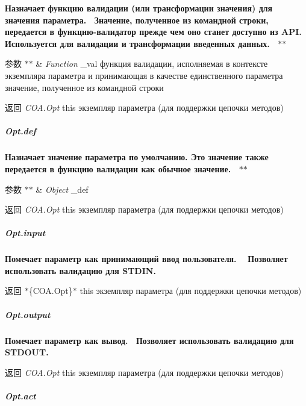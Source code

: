 {\bfseries {\bfseries {\bfseries {\bfseries  Назначает функцию валидации (или трансформации значения) для значения параметра.~\newline
 Значение, полученное из командной строки, передается в функцию-\/валидатор прежде чем оно станет доступно из A\+PI.~\newline
 Используется для валидации и трансформации введенных данных.~\newline
 $\ast$$\ast$
\begin{DoxyParams}{参数}
{\em $\ast$$\ast$} & {\itshape Function} {\ttfamily \+\_\+val} функция валидации, исполняемая в контексте экземпляра параметра и принимающая в качестве единственного параметра значение, полученное из командной строки~\newline
 {\bfseries }\\
\hline
\end{DoxyParams}
\begin{DoxyReturn}{返回}
{\bfseries } {\itshape C\+O\+A.\+Opt} {\ttfamily this} экземпляр параметра (для поддержки цепочки методов)
\end{DoxyReturn}
\subparagraph*{Opt.\+def}}}}}

{\bfseries {\bfseries {\bfseries {\bfseries  Назначает значение параметра по умолчанию. Это значение также передается в функцию валидации как обычное значение.~\newline
 $\ast$$\ast$
\begin{DoxyParams}{参数}
{\em $\ast$$\ast$} & {\itshape Object} {\ttfamily \+\_\+def}~\newline
 {\bfseries }\\
\hline
\end{DoxyParams}
\begin{DoxyReturn}{返回}
{\bfseries } {\itshape C\+O\+A.\+Opt} {\ttfamily this} экземпляр параметра (для поддержки цепочки методов)
\end{DoxyReturn}
\subparagraph*{Opt.\+input}}}}}

{\bfseries {\bfseries {\bfseries {\bfseries  Помечает параметр как принимающий ввод пользователя. ~\newline
 Позволяет использовать валидацию для S\+T\+D\+IN.~\newline
 {\bfseries \begin{DoxyReturn}{返回}
$\ast$\{C\+O\+A.\+Opt\}$\ast$ {\ttfamily this} экземпляр параметра (для поддержки цепочки методов)
\end{DoxyReturn}
\subparagraph*{Opt.\+output}}}}}}

{\bfseries {\bfseries {\bfseries {\bfseries {\bfseries  Помечает параметр как вывод.~\newline
 Позволяет использовать валидацию для S\+T\+D\+O\+UT.~\newline
 {\bfseries \begin{DoxyReturn}{返回}
{\itshape C\+O\+A.\+Opt} {\ttfamily this} экземпляр параметра (для поддержки цепочки методов)
\end{DoxyReturn}
\subparagraph*{Opt.\+act}}}}}}}

